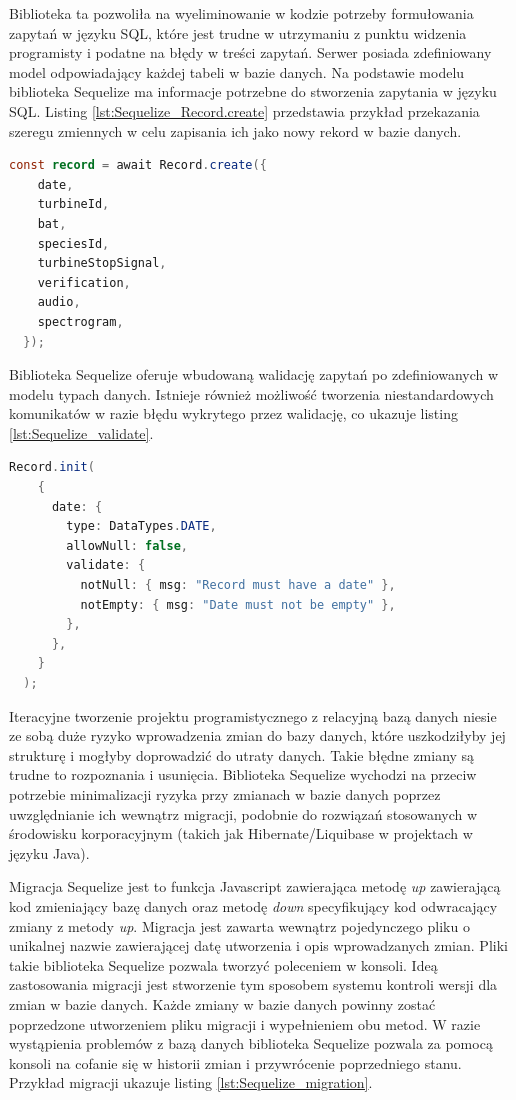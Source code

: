 \documentclass{sprz}
\begin{document}
Biblioteka ta pozwoliła na wyeliminowanie w kodzie potrzeby formułowania zapytań w języku SQL, które jest trudne w utrzymaniu z punktu widzenia programisty i podatne na błędy w treści zapytań. Serwer posiada zdefiniowany model odpowiadający każdej tabeli w bazie danych. Na podstawie modelu biblioteka Sequelize ma informacje potrzebne do stworzenia zapytania w języku SQL. Listing \ref{lst:Sequelize_Record.create} przedstawia przykład przekazania szeregu zmiennych w celu zapisania ich jako nowy rekord w bazie danych.

\begin{lstlisting}[language=Java,caption={Przykład tworzenia rekordu z pomocą biblioteki Sequelize}, label={lst:Sequelize_Record.create}]
  const record = await Record.create({
    date,
    turbineId,
    bat,
    speciesId,
    turbineStopSignal,
    verification,
    audio,
    spectrogram,
  });
\end{lstlisting}

Biblioteka Sequelize oferuje wbudowaną walidację zapytań po zdefiniowanych w modelu typach danych. Istnieje również możliwość tworzenia niestandardowych komunikatów w razie błędu wykrytego przez walidację, co ukazuje listing \ref{lst:Sequelize_validate}.

\begin{lstlisting}[language=Java,caption={Przykład niestandardowego komunikatu walidacji}, label={lst:Sequelize_validate}]
  Record.init(
    {
      date: {
        type: DataTypes.DATE,
        allowNull: false,
        validate: {
          notNull: { msg: "Record must have a date" },
          notEmpty: { msg: "Date must not be empty" },
        },
      },
    }
  );
\end{lstlisting}

Iteracyjne tworzenie projektu programistycznego z relacyjną bazą danych niesie ze sobą duże ryzyko wprowadzenia zmian do bazy danych, które uszkodziłyby jej strukturę i mogłyby doprowadzić do utraty danych. Takie błędne zmiany są trudne to rozpoznania i usunięcia. Biblioteka Sequelize wychodzi na przeciw potrzebie minimalizacji ryzyka przy zmianach w bazie danych poprzez uwzględnianie ich wewnątrz migracji, podobnie do rozwiązań stosowanych w środowisku korporacyjnym (takich jak Hibernate/Liquibase w projektach w języku Java).

Migracja Sequelize jest to funkcja Javascript zawierająca metodę \textit{up} zawierającą kod zmieniający bazę danych oraz metodę \textit{down} specyfikujący kod odwracający zmiany z metody \textit{up}. Migracja jest zawarta wewnątrz pojedynczego pliku o unikalnej nazwie zawierającej datę utworzenia i opis wprowadzanych zmian. Pliki takie biblioteka Sequelize pozwala tworzyć poleceniem w konsoli. Ideą zastosowania migracji jest stworzenie tym sposobem systemu kontroli wersji dla zmian w bazie danych. Każde zmiany w bazie danych powinny zostać poprzedzone utworzeniem pliku migracji i wypełnieniem obu metod. W razie wystąpienia problemów z bazą danych biblioteka Sequelize pozwala za pomocą konsoli na cofanie się w historii zmian i przywrócenie poprzedniego stanu. Przykład migracji ukazuje listing \ref{lst:Sequelize_migration}.
\end{document}

